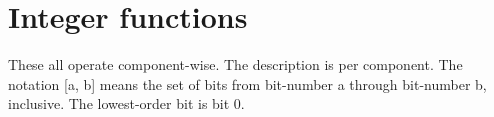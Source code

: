 \hypertarget{group__core__func__integer}{\section{\-Integer functions}
\label{group__core__func__integer}
}
\-These all operate component-\/wise. \-The description is per component. \-The notation \mbox{[}a, b\mbox{]} means the set of bits from bit-\/number a through bit-\/number b, inclusive. \-The lowest-\/order bit is bit 0. 